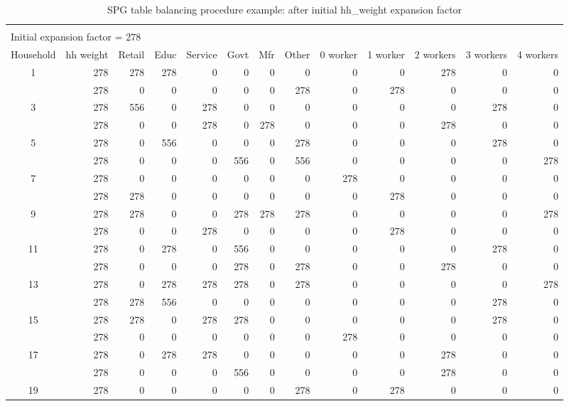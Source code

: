 \begin{sidewaystable}  %
\centering
\caption{SPG table balancing procedure example: after initial hh\_weight expansion factor}
\label{tab:spg-after-initial-expansion}
\small
\begin{tabular}{c*{12}{r}}
\vspace{-8pt} \\
\multicolumn{8}{l}{Initial expansion factor = 278} \\
\hline
Household & hh weight & Retail & Educ & Service & Govt & Mfr & Other & 0 worker & 1 worker & 2 workers & 3 workers & 4 workers \\
\hline
1 & 278 & 278 & 278 & 0 & 0 & 0 & 0 & 0 & 0 & 278 & 0 & 0 \\
\gray 2 & 278 & 0 & 0 & 0 & 0 & 0 & 278 & 0 & 278 & 0 & 0 & 0 \\
3 & 278 & 556 & 0 & 278 & 0 & 0 & 0 & 0 & 0 & 0 & 278 & 0 \\
\gray 4 & 278 & 0 & 0 & 278 & 0 & 278 & 0 & 0 & 0 & 278 & 0 & 0 \\
5 & 278 & 0 & 556 & 0 & 0 & 0 & 278 & 0 & 0 & 0 & 278 & 0 \\
\gray 6 & 278 & 0 & 0 & 0 & 556 & 0 & 556 & 0 & 0 & 0 & 0 & 278 \\
7 & 278 & 0 & 0 & 0 & 0 & 0 & 0 & 278 & 0 & 0 & 0 & 0 \\
\gray 8 & 278 & 278 & 0 & 0 & 0 & 0 & 0 & 0 & 278 & 0 & 0 & 0 \\
9 & 278 & 278 & 0 & 0 & 278 & 278 & 278 & 0 & 0 & 0 & 0 & 278 \\
\gray 10 & 278 & 0 & 0 & 278 & 0 & 0 & 0 & 0 & 278 & 0 & 0 & 0 \\
11 & 278 & 0 & 278 & 0 & 556 & 0 & 0 & 0 & 0 & 0 & 278 & 0 \\
\gray 12 & 278 & 0 & 0 & 0 & 278 & 0 & 278 & 0 & 0 & 278 & 0 & 0 \\
13 & 278 & 0 & 278 & 278 & 278 & 0 & 278 & 0 & 0 & 0 & 0 & 278 \\
\gray 14 & 278 & 278 & 556 & 0 & 0 & 0 & 0 & 0 & 0 & 0 & 278 & 0 \\
15 & 278 & 278 & 0 & 278 & 278 & 0 & 0 & 0 & 0 & 0 & 278 & 0 \\
\gray 16 & 278 & 0 & 0 & 0 & 0 & 0 & 0 & 278 & 0 & 0 & 0 & 0 \\
17 & 278 & 0 & 278 & 278 & 0 & 0 & 0 & 0 & 0 & 278 & 0 & 0 \\
\gray 18 & 278 & 0 & 0 & 0 & 556 & 0 & 0 & 0 & 0 & 278 & 0 & 0 \\
19 & 278 & 0 & 0 & 0 & 0 & 0 & 278 & 0 & 278 & 0 & 0 & 0 \\

\end{tabular}
\end{sidewaystable}
